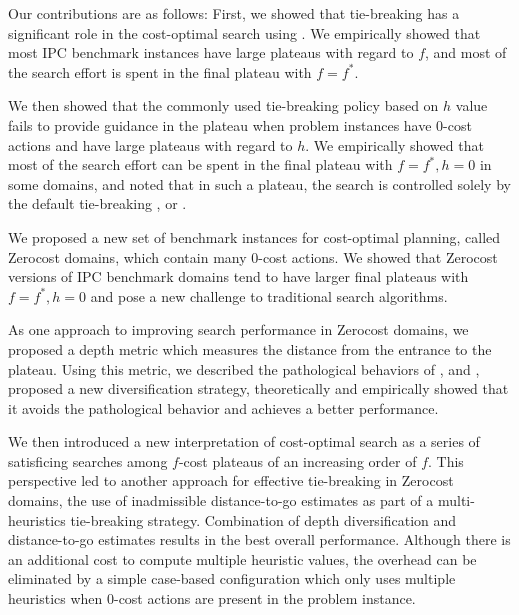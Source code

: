 Our contributions are as follows:
 First, we showed that tie-breaking has a significant role in the cost-optimal
       search using \astar. We empirically showed that most  IPC
       benchmark instances have large plateaus with regard to $f$, and most of the
       search effort is spent in the final plateau with $f=f^*$.

 We then showed that  the commonly used tie-breaking policy based on $h$ value fails to
       provide guidance in the plateau when problem instances have 0-cost
       actions and have large plateaus with regard to $h$.
       We empirically showed that most of the search effort can be spent in
       the final plateau with $f=f^*, h=0$ in some domains, and noted that in such
       a plateau, the search is controlled solely by the
       default tie-breaking \fifo, \lifo or \ro.

 We proposed  a new set of benchmark instances for cost-optimal planning, called Zerocost
 domains, which contain many 0-cost actions.
         We showed that Zerocost versions of IPC benchmark domains tend to have larger final plateaus with $f=f^*, h=0$ and pose a new challenge to traditional search algorithms.

 As one approach to improving search performance in Zerocost domains, we proposed a depth metric
       which measures the distance from the entrance to the
       plateau. Using this metric, we described the pathological
       behaviors of \fifo, \lifo and \ro, proposed a new diversification
       strategy, theoretically and empirically showed that it avoids the
       pathological behavior and achieves a better performance.

We then introduced a new interpretation of cost-optimal \astar search as a series of satisficing
       searches among $f$-cost plateaus of an increasing order of $f$. 
This perspective led to another approach for effective tie-breaking in Zerocost domains, the use of
       inadmissible distance-to-go estimates as part of a multi-heuristics tie-breaking strategy.
       Combination of depth diversification and distance-to-go estimates results in the best overall performance. Although there is an additional cost to compute
       multiple heuristic values, the overhead can be eliminated by a simple
       case-based configuration which only uses multiple heuristics when 0-cost actions are present in the problem instance.

